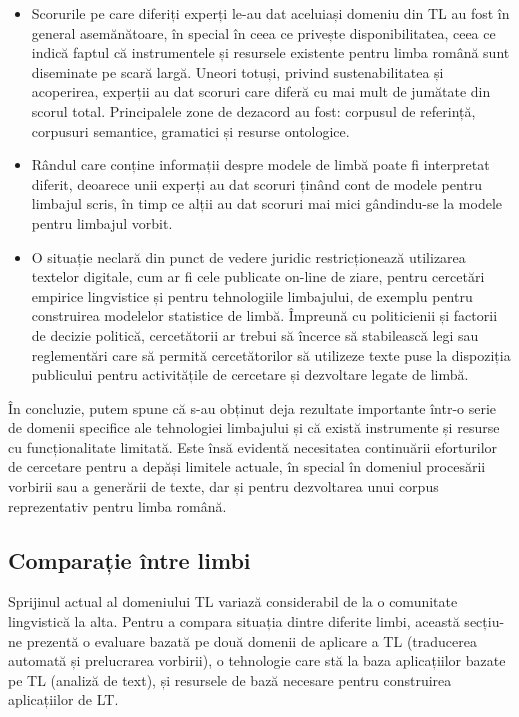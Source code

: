 \documentclass[]{../../metanetpaper}
\begin{document}
\begin{multicols}{2}
\begin{itemize}
\item Scorurile pe care diferiți experți le-au dat aceluiași domeniu din TL au fost în general asemănătoare, în special în ceea ce privește disponibilitatea, ceea ce indică faptul că instrumentele și resursele existente pentru limba română sunt diseminate pe scară largă. Uneori totuși, privind sustenabilitatea și acoperirea, experții au dat scoruri care diferă cu mai mult de jumătate din scorul total. Principalele zone de dezacord au fost: corpusul de referință, corpusuri semantice, gramatici și resurse ontologice.
\item Rândul care conține informații despre modele de limbă poate fi interpretat diferit, deoarece unii experți au dat scoruri ținând cont de modele pentru limbajul scris, în timp ce alții au dat scoruri mai mici gândindu-se la modele pentru limbajul vorbit. 
\item O situație neclară din punct de vedere juridic restricționează utilizarea textelor digitale, cum ar fi cele publicate on-line de ziare, pentru cercetări empirice lingvistice și pentru tehnologiile limbajului, de exemplu pentru construirea modelelor statistice de limbă. Împreună cu politicienii și factorii de decizie politică, cercetătorii ar trebui să încerce să stabilească legi sau reglementări care să permită cercetătorilor să utilizeze texte puse la dispoziția publicului pentru activitățile de cercetare și dezvoltare legate de limbă.
\end{itemize}

În concluzie, putem spune că s-au obținut deja rezultate importante într-o serie de domenii specifice ale tehnologiei limbajului și că există instrumente și resurse cu funcționalitate limitată. Este însă evidentă necesitatea continuării eforturilor de cercetare pentru a depăși limitele actuale, în special în domeniul procesării vorbirii sau a generării de texte, dar și pentru dezvoltarea unui corpus reprezentativ pentru limba română.

\subsection{Comparație între limbi}

Sprijinul actual al domeniului TL variază considerabil de la o comunitate lingvistică la alta. Pentru a compara situația dintre diferite limbi, această secțiu-\newline ne prezentă o evaluare bazată pe două domenii de aplicare a TL (traducerea automată și prelucrarea vorbirii), o tehnologie care stă la baza aplicațiilor bazate pe TL (analiză de text), și resursele de bază necesare pentru construirea aplicațiilor de LT.


\end{multicols}
\end{document}
